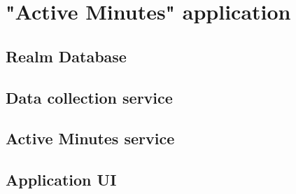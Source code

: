 \section{"Active Minutes" application}   
    
    \subsection{Realm Database}
    
    \subsection{Data collection service}
    
    \subsection{Active Minutes service}
    
    \subsection{Application UI}  




    
    
    
    